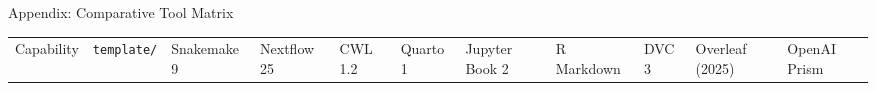 \documentclass[
  ignorenonframetext,
]{beamer}
\newcounter{none} %
\begin{document}
\begin{frame}[fragile]{Appendix: Comparative Tool Matrix}
{\def\LTcaptype{none} %
\begin{longtable}[]{@{}
  >{\raggedright\arraybackslash}p{}
  >{\centering\arraybackslash}p{}
  >{\centering\arraybackslash}p{}
  >{\centering\arraybackslash}p{}
  >{\centering\arraybackslash}p{}
  >{\centering\arraybackslash}p{}
  >{\centering\arraybackslash}p{}
  >{\centering\arraybackslash}p{}
  >{\centering\arraybackslash}p{}
  >{\centering\arraybackslash}p{}
  >{\centering\arraybackslash}p{}@{}}
\toprule\noalign{}
\begin{minipage}[b]{\linewidth}\raggedright
Capability
\end{minipage} & \begin{minipage}[b]{\linewidth}\centering
\texttt{template/}
\end{minipage} & \begin{minipage}[b]{\linewidth}\centering
Snakemake 9
\end{minipage} & \begin{minipage}[b]{\linewidth}\centering
Nextflow 25
\end{minipage} & \begin{minipage}[b]{\linewidth}\centering
CWL 1.2
\end{minipage} & \begin{minipage}[b]{\linewidth}\centering
Quarto 1
\end{minipage} & \begin{minipage}[b]{\linewidth}\centering
Jupyter Book 2
\end{minipage} & \begin{minipage}[b]{\linewidth}\centering
R Markdown
\end{minipage} & \begin{minipage}[b]{\linewidth}\centering
DVC 3
\end{minipage} & \begin{minipage}[b]{\linewidth}\centering
Overleaf (2025)
\end{minipage} & \begin{minipage}[b]{\linewidth}\centering
OpenAI Prism
\end{minipage} \\

\end{longtable}}
\end{frame}
\end{document}
